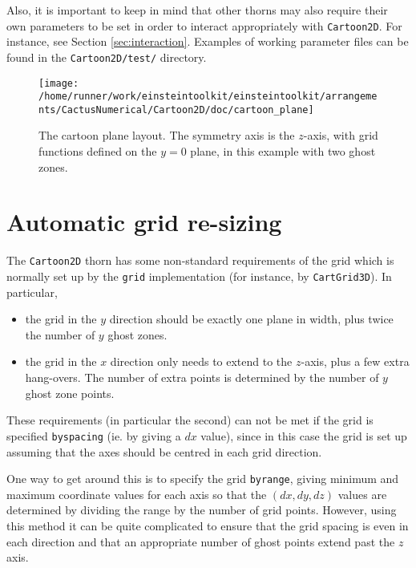\documentclass{article}
\begin{document}
Also, it is important to keep in mind that other thorns may also
require their own parameters to be set in order to interact
appropriately with \texttt{Cartoon2D}. For instance, see Section
\ref{sec:interaction}. Examples of working parameter files can be
found in the \texttt{Cartoon2D/test/} directory.

\begin{figure}
  \centering
  \texttt{[image: /home/runner/work/einsteintoolkit/einsteintoolkit/arrangements/CactusNumerical/Cartoon2D/doc/cartoon\_plane]}
  \caption{The cartoon plane layout. The symmetry axis is the
    $z$-axis, with grid functions defined on the $y=0$ plane, in this
    example with two ghost zones.}
\end{figure}

\section{Automatic grid re-sizing}
\label{sec:regrid}

The \texttt{Cartoon2D} thorn has some non-standard requirements of the
grid which is normally set up by the \texttt{grid} implementation (for
instance, by \texttt{CartGrid3D}). In particular,

\begin{itemize}

  \item the grid in the $y$ direction should be exactly one plane in
    width, plus twice the number of $y$ ghost zones.

  \item the grid in the $x$ direction only needs to extend to the
    $z$-axis, plus a few extra hang-overs. The number of extra points
    is determined by the number of $y$ ghost zone points.

\end{itemize}

These requirements (in particular the second) can not be met if the
grid is specified \texttt{byspacing} (ie. by giving a $dx$ value),
since in this case the grid is set up assuming that the axes should be
centred in each grid direction.

One way to get around this is to specify the grid \texttt{byrange},
giving minimum and maximum coordinate values for each axis so that the
$(dx,dy,dz)$ values are determined by dividing the range by the number
of grid points. However, using this method it can be quite complicated
to ensure that the grid spacing is even in each direction and that an
appropriate number of ghost points extend past the $z$ axis.
\end{document}
